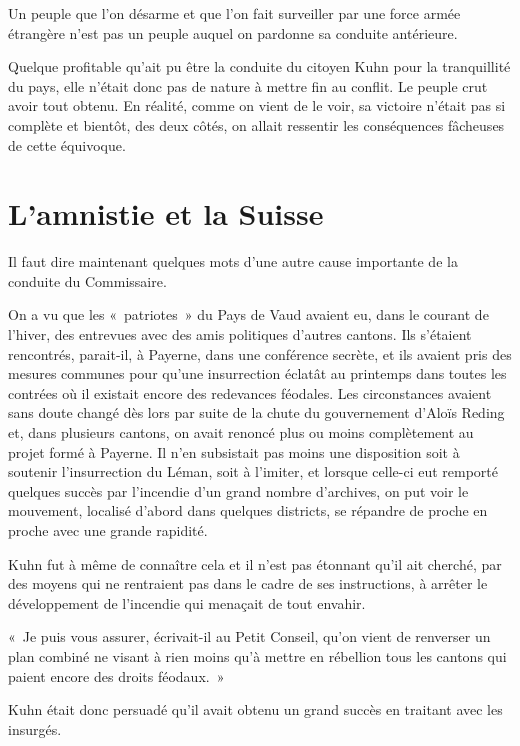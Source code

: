 \documentclass[french,twoside]{book} %
\newenvironment{quoteblock}%
  {\begin{quoting}}
  {\end{quoting}}
\newenvironment{quotebar}{%
    \def\FrameCommand{{\color{rubric!10!}\vrule width 0.5em} \hspace{0.9em}}%
    \def\OuterFrameSep{\itemsep} %
    \MakeFramed {\advance\hsize-\width \FrameRestore}
  }%
  {%
    \endMakeFramed
  }
\renewenvironment{quoteblock}%
  {%
    \savenotes
    \setstretch{0.9}
    \normalfont
    \begin{quotebar}
  }
  {%
    \end{quotebar}
    \spewnotes
  }
\begin{document}
\noindent Un peuple que l’on désarme et que l’on fait surveiller par une force armée étrangère n’est pas un peuple auquel on pardonne sa conduite antérieure.\par
Quelque profitable qu’ait pu être la conduite du citoyen Kuhn pour la tranquillité du pays, elle n’était donc pas de nature à mettre fin au conflit. Le peuple crut avoir tout obtenu. En réalité, comme on vient de le voir, sa victoire n’était pas si complète et bientôt, des deux côtés, on allait ressentir les conséquences fâcheuses de cette équivoque.
\section[{L’amnistie et la Suisse}]{L’amnistie et la Suisse}
\noindent Il faut dire maintenant quelques mots d’une autre cause importante de la conduite du Commissaire.\par
On a vu que les « patriotes » du Pays de Vaud avaient eu, dans le courant de l’hiver, des entrevues avec des amis politiques d’autres cantons. Ils s’étaient rencontrés, parait-il, à Payerne, dans une conférence secrète, et ils avaient pris des mesures communes pour qu’une insurrection éclatât au printemps dans toutes les contrées où il existait encore des redevances féodales. Les circonstances avaient sans doute changé dès lors par suite de la chute du gouvernement d’Aloïs Reding et, dans plusieurs cantons, on avait renoncé plus ou moins complètement au projet formé à Payerne. Il n’en subsistait pas moins une disposition soit à soutenir l’insurrection du Léman, soit à l’imiter, et lorsque celle-ci eut remporté quelques succès par l’incendie d’un grand nombre d’archives, on put voir le mouvement, localisé d’abord dans quelques districts, se répandre de proche en proche avec une grande rapidité.\par
Kuhn fut à même de connaître cela et il n’est pas étonnant qu’il ait cherché, par des moyens qui ne rentraient pas dans le cadre de ses instructions, à arrêter le développement de l’incendie qui menaçait de tout envahir.\par

\begin{quoteblock}
 \noindent « Je puis vous assurer, écrivait-il au Petit Conseil, qu’on vient de renverser un plan combiné ne visant à rien moins qu’à mettre en rébellion tous les cantons qui paient encore des droits féodaux. »
 \end{quoteblock}

\noindent Kuhn était donc persuadé qu’il avait obtenu un grand succès en traitant avec les insurgés.\par
\end{document}

